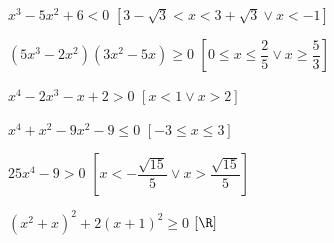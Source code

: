 \begin{esercizio}[*]
\begin{enumeratea}
\item \(x^3-5x^2+6<0\) \hfill \(\left[3-\sqrt 3<x<3+\sqrt 3\vee x<-1\right]\)
\item \(\left(5x^3-2x^2\right)\left(3x^2-5x\right)\ge 0\) 
 \hfill \(\left[0\le x\le \dfrac 2 5\vee x\ge \dfrac 5 3\right]\)
\item \(x^4-2x^3-x+2>0\) \hfill \(\left[x<1\vee x>2\right]\)
\item \(x^4+x^2-9x^2-9\le 0\) \hfill \(\left[-3\le x\le 3\right]\)
\item \(25x^4-9>0\) 
 \hfill \(\left[x<-\dfrac{\sqrt{15}} 5\vee x>\dfrac{\sqrt{15}} 5\right]\)
\item \(\left(x^2+x\right)^2+2\left(x+1\right)^2\ge 0\) 
 \hfill \(\left[\R\right]\)
\end{enumeratea}
\end{esercizio}
% 
% 
